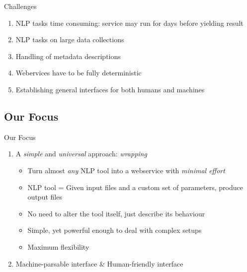 \documentclass[compress]{beamer}
\begin{document}
\begin{frame}
    \begin{block}{Challenges} 
        \begin{enumerate}
            \item NLP tasks time consuming: service may run for days before yielding result
            \item NLP tasks on large data collections
            \item Handling of metadata descriptions
            \item Webervices have to be fully deterministic
            \item Establishing general interfaces for both humans and machines            
        \end{enumerate}
    \end{block}

\end{frame}



\subsection{Our Focus}
\begin{frame}
    \begin{block}{Our Focus}
   
        \begin{enumerate}
            \item A \emph{simple} and \emph{universal} approach: \emph{wrapping}
            \begin{itemize}
                \item Turn almost \emph{any} NLP tool into a webservice with \emph{minimal effort}
                \item NLP tool = Given input files and a custom set of parameters, produce output files
                \item No need to alter the tool itself, just describe its behaviour
                \item Simple, yet powerful enough to deal with complex setups
                \item Maximum flexibility
            \end{itemize}
            \item Machine-parsable interface \& Human-friendly interface            
        \end{enumerate}
    
    \end{block}
\end{frame}
\end{document}
